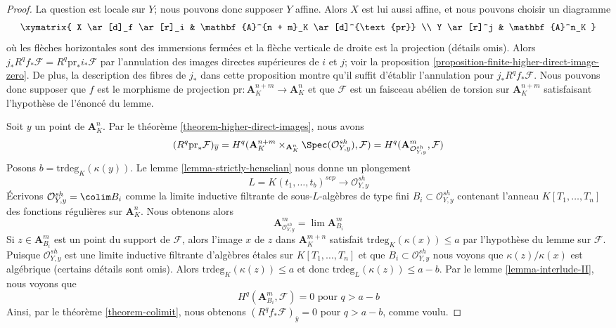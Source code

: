 \begin{proof}
La question est locale sur $Y$; nous pouvons donc supposer $Y$ affine.
Alors $X$ est lui aussi affine, et nous pouvons choisir un diagramme
$$
\xymatrix{
X \ar[d]_f \ar[r]_i & \mathbf{A}^{n + m}_K \ar[d]^{\text{pr}} \\
Y \ar[r]^j & \mathbf{A}^n_K
}
$$
où les flèches horizontales sont des immersions fermées et la flèche
verticale de droite est la projection (détails omis).
Alors $j_*R^qf_*\mathcal{F} = R^q\text{pr}_*i_*\mathcal{F}$
par l'annulation des images directes supérieures de $i$ et $j$; voir la
proposition \ref{proposition-finite-higher-direct-image-zero}.
De plus, la description des fibres de $j_*$ dans cette proposition
montre qu'il suffit d'établir l'annulation pour $j_*R^qf_*\mathcal{F}$.
Nous pouvons donc supposer que $f$ est le morphisme de
projection $\text{pr} : \mathbf{A}^{n + m}_K \to \mathbf{A}^n_K$
et que $\mathcal{F}$ est un faisceau abélien de torsion sur $\mathbf{A}^{n + m}_K$
satisfaisant l'hypothèse de l'énoncé du lemme.

\medskip\noindent
Soit $y$ un point de $\mathbf{A}^n_K$.
Par le théorème \ref{theorem-higher-direct-images}, nous avons
$$
(R^q\text{pr}_*\mathcal{F})_{\overline{y}} =
H^q(\mathbf{A}^{n + m}_K \times_{\mathbf{A}^n_K} \Spec(\mathcal{O}_{Y, y}^{sh}),
\mathcal{F}) =
H^q(\mathbf{A}^m_{\mathcal{O}_{Y, y}^{sh}}, \mathcal{F})
$$
Posons $b = \text{trdeg}_K(\kappa(y))$. Le lemme \ref{lemma-strictly-henselian}
nous donne un plongement
$$
L = K(t_1, \ldots, t_b)^{sep} \longrightarrow \mathcal{O}_{Y, y}^{sh}
$$
Écrivons $\mathcal{O}_{Y, y}^{sh} = \colim B_i$ comme la limite
inductive filtrante de sous-$L$-algèbres de type fini $B_i \subset \mathcal{O}_{Y, y}^{sh}$
contenant l'anneau $K[T_1, \ldots, T_n]$ des fonctions régulières
sur $\mathbf{A}^n_K$. Nous obtenons alors
$$
\mathbf{A}^m_{\mathcal{O}_{Y, y}^{sh}} =
\lim \mathbf{A}^m_{B_i}
$$
Si $z \in \mathbf{A}^m_{B_i}$ est un point du support de
$\mathcal{F}$, alors l'image $x$ de $z$ dans $\mathbf{A}^{m + n}_K$
satisfait $\text{trdeg}_K(\kappa(x)) \leq a$ par l'hypothèse du lemme sur
$\mathcal{F}$.
Puisque $\mathcal{O}_{Y, y}^{sh}$ est une limite inductive filtrante
d'algèbres étales sur $K[T_1, \ldots, T_n]$ et que
$B_i \subset \mathcal{O}_{Y, y}^{sh}$
nous voyons que $\kappa(z)/\kappa(x)$ est algébrique
(certains détails sont omis). Alors $\text{trdeg}_K(\kappa(z)) \leq a$
et donc $\text{trdeg}_L(\kappa(z)) \leq a - b$.
Par le lemme \ref{lemma-interlude-II}, nous voyons que
$$
H^q(\mathbf{A}^m_{B_i}, \mathcal{F}) = 0\text{ pour }q > a - b
$$
Ainsi, par le théorème \ref{theorem-colimit}, nous obtenons
$(R^qf_*\mathcal{F})_{\overline{y}} = 0$ pour $q > a - b$,
comme voulu.
\end{proof}








